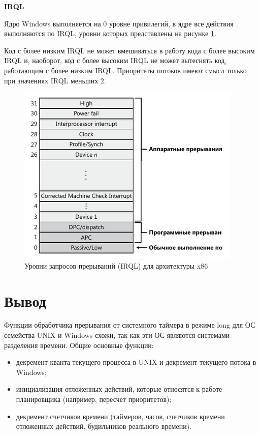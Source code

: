 \documentclass[a4paper,14pt,russian]{extreport}
\begin{document}
	\textbf{IRQL}
	
	Ядро Windows выполняется на 0 уровне привилегий, в ядре все действия выполняются по IRQL, уровни которых представлены на рисунке \ref{fig:irql}.
	
	Код с более низким IRQL не может вмешиваться в работу кода с более высоким IRQL и, наоборот, код с более высоким IRQL не может вытеснять код, работающим с более низким IRQL. Приоритеты потоков имеют смысл только при значениях IRQL меньших 2.
	
	\begin{figure}[H]
		\centering
		\includegraphics[width=0.7\linewidth]{img/IRQL}
		\caption{Уровни запросов прерываний (IRQL) для архитектуры x86}
		\label{fig:irql}
	\end{figure}
	
%	
	
	\section{Вывод}
	Функции обработчика прерывания от системного таймера в режиме long для ОС семейства UNIX и Windows схожи, так как эти ОС являются системами разделения времени.
	Общие основные функции:
	\begin{itemize}
		\item декремент кванта текущего процесса в UNIX и декремент текущего потока в Windows;
		\item инициализация отложенных действий, которые относятся к работе планировщика (например, пересчет приоритетов);
		\item декремент счетчиков времени (таймеров, часов, счетчиков времени
		отложенных действий, будильников реального времени).
	\end{itemize}
\end{document}
